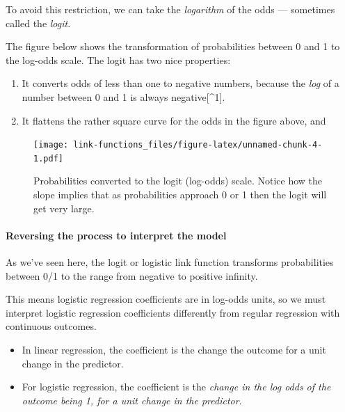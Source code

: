 \documentclass[]{article}
\let\oldparagraph\paragraph
\renewcommand{\paragraph}[1]{\oldparagraph{#1}\mbox{}}
\begin{document}
To avoid this restriction, we can take the \emph{logarithm} of the odds --- sometimes
called the \emph{logit}.

The figure below shows the transformation of probabilities between 0 and 1 to
the log-odds scale. The logit has two nice properties:

\begin{enumerate}
\def\labelenumi{\arabic{enumi}.}
\item
  It converts odds of less than one to negative numbers, because the \emph{log} of
  a number between 0 and 1 is always negative{[}\^{}1{]}.
\item
  It flattens the rather square curve for the odds in the figure above, and
\end{enumerate}

\begin{figure}
\centering
\texttt{[image: link-functions\_files/figure-latex/unnamed-chunk-4-1.pdf]}
\caption{\label{fig:unnamed-chunk-4}Probabilities converted to the logit (log-odds) scale. Notice how the slope implies that as probabilities approach 0 or 1 then the logit will get very large.}
\end{figure}

\hypertarget{reversing-the-process-to-interpret-the-model}{%
\paragraph{Reversing the process to interpret the model}\label{reversing-the-process-to-interpret-the-model}}

As we've seen here, the logit or logistic link function transforms probabilities
between 0/1 to the range from negative to positive infinity.

This means logistic regression coefficients are in log-odds units, so we must
interpret logistic regression coefficients differently from regular regression
with continuous outcomes.

\begin{itemize}
\item
  In linear regression, the coefficient is the change the outcome for a unit
  change in the predictor.
\item
  For logistic regression, the coefficient is the \emph{change in the log odds of
  the outcome being 1, for a unit change in the predictor}.
\end{itemize}
\end{document}
